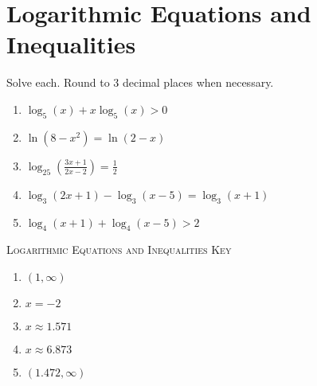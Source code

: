 \chapter{Logarithmic Equations and Inequalities}

Solve each. Round to 3 decimal places when necessary.
\begin{enumerate}
	\item $\log_5(x) + x\log_5(x) > 0$
	\item $\ln\left(8-x^2\right) = \ln(2-x)$
	\item $\log_{25}\left(\frac{3x+1}{2x-2}\right) = \frac{1}{2}$
	\item $\log_3(2x+1)-\log_3(x-5) = \log_3(x+1)$
	\item $\log_4(x+1) + \log_4(x-5) > 2$
\end{enumerate}

\newpage

\textsc{Logarithmic Equations and Inequalities Key}

\begin{enumerate}
	\item $(1, \infty)$
	\item $x = -2$
	\item $x \approx 1.571$
	\item $x \approx 6.873$
	\item $(1.472, \infty)$
\end{enumerate}
